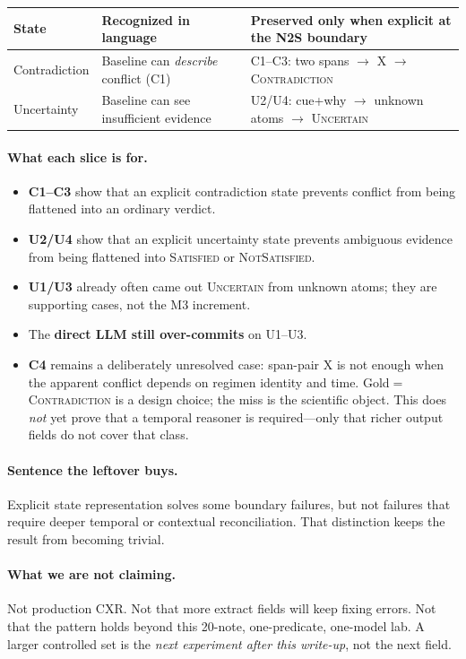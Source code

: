 \documentclass[11pt,a4paper]{article}
\newcommand{\sat}{\textsc{Satisfied}}
\newcommand{\nsat}{\textsc{NotSatisfied}}
\newcommand{\unc}{\textsc{Uncertain}}
\newcommand{\con}{\textsc{Contradiction}}
\begin{document}
\begin{center}
\begin{tabularx}{\textwidth}{@{}l Y Y@{}}
\toprule
State & Recognized in language & Preserved only when explicit at the N2S boundary \\
\midrule
Contradiction & Baseline can \emph{describe} conflict (C1) & C1--C3: two spans $\rightarrow$ X $\rightarrow$ \con \\
Uncertainty & Baseline can see insufficient evidence & U2/U4: cue+why $\rightarrow$ unknown atoms $\rightarrow$ \unc \\
\bottomrule
\end{tabularx}
\end{center}

\paragraph{What each slice is for.}
\begin{itemize}
  \item \textbf{C1--C3} show that an explicit contradiction state prevents conflict from being flattened into an ordinary verdict.
  \item \textbf{U2/U4} show that an explicit uncertainty state prevents ambiguous evidence from being flattened into \sat{} or \nsat.
  \item \textbf{U1/U3} already often came out \unc{} from unknown atoms; they are supporting cases, not the M3 increment.
  \item The \textbf{direct LLM still over-commits} on U1--U3.
  \item \textbf{C4} remains a deliberately unresolved case: span-pair X is not enough when the apparent conflict depends on regimen identity and time. Gold$=$\con{} is a design choice; the miss is the scientific object. This does \emph{not} yet prove that a temporal reasoner is required---only that richer output fields do not cover that class.
\end{itemize}

\paragraph{Sentence the leftover buys.}
Explicit state representation solves some boundary failures, but not failures that require deeper temporal or contextual reconciliation.
That distinction keeps the result from becoming trivial.

\paragraph{What we are not claiming.}
Not production CXR.
Not that more extract fields will keep fixing errors.
Not that the pattern holds beyond this 20-note, one-predicate, one-model lab.
A larger controlled set is the \emph{next experiment after this write-up}, not the next field.
\end{document}
